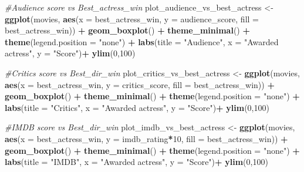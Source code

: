 \documentclass[]{article}
\newenvironment{Shaded}{\begin{snugshade}}{\end{snugshade}}
\newcommand{\KeywordTok}[1]{\textcolor[rgb]{0.13,0.29,0.53}{\textbf{#1}}}
\newcommand{\DataTypeTok}[1]{\textcolor[rgb]{0.13,0.29,0.53}{#1}}
\newcommand{\DecValTok}[1]{\textcolor[rgb]{0.00,0.00,0.81}{#1}}
\newcommand{\StringTok}[1]{\textcolor[rgb]{0.31,0.60,0.02}{#1}}
\newcommand{\CommentTok}[1]{\textcolor[rgb]{0.56,0.35,0.01}{\textit{#1}}}
\newcommand{\OperatorTok}[1]{\textcolor[rgb]{0.81,0.36,0.00}{\textbf{#1}}}
\newcommand{\NormalTok}[1]{#1}
\begin{document}
\begin{Shaded}
\begin{Highlighting}[]
\CommentTok{#Audience score vs Best_actress_win}
\NormalTok{plot_audience_vs_best_actress <-}
\StringTok{  }\KeywordTok{ggplot}\NormalTok{(movies,}
         \KeywordTok{aes}\NormalTok{(}\DataTypeTok{x =}\NormalTok{ best_actress_win, }\DataTypeTok{y =}\NormalTok{ audience_score, }\DataTypeTok{fill =}\NormalTok{ best_actress_win)) }\OperatorTok{+}
\StringTok{  }\KeywordTok{geom_boxplot}\NormalTok{() }\OperatorTok{+}
\StringTok{  }\KeywordTok{theme_minimal}\NormalTok{() }\OperatorTok{+}
\StringTok{  }\KeywordTok{theme}\NormalTok{(}\DataTypeTok{legend.position =} \StringTok{"none"}\NormalTok{) }\OperatorTok{+}
\StringTok{  }\KeywordTok{labs}\NormalTok{(}\DataTypeTok{title =} \StringTok{"Audience"}\NormalTok{, }\DataTypeTok{x =} \StringTok{"Awarded actress"}\NormalTok{, }\DataTypeTok{y =} \StringTok{"Score"}\NormalTok{)}\OperatorTok{+}
\StringTok{  }\KeywordTok{ylim}\NormalTok{(}\DecValTok{0}\NormalTok{,}\DecValTok{100}\NormalTok{)}

\CommentTok{#Critics score vs Best_dir_win}
\NormalTok{plot_critics_vs_best_actress <-}
\StringTok{  }\KeywordTok{ggplot}\NormalTok{(movies,}
         \KeywordTok{aes}\NormalTok{(}\DataTypeTok{x =}\NormalTok{ best_actress_win, }\DataTypeTok{y =}\NormalTok{ critics_score, }\DataTypeTok{fill =}\NormalTok{ best_actress_win)) }\OperatorTok{+}
\StringTok{  }\KeywordTok{geom_boxplot}\NormalTok{() }\OperatorTok{+}
\StringTok{  }\KeywordTok{theme_minimal}\NormalTok{() }\OperatorTok{+}
\StringTok{  }\KeywordTok{theme}\NormalTok{(}\DataTypeTok{legend.position =} \StringTok{"none"}\NormalTok{) }\OperatorTok{+}
\StringTok{  }\KeywordTok{labs}\NormalTok{(}\DataTypeTok{title =} \StringTok{"Critics"}\NormalTok{, }\DataTypeTok{x =} \StringTok{"Awarded actress"}\NormalTok{, }\DataTypeTok{y =} \StringTok{"Score"}\NormalTok{)}\OperatorTok{+}
\StringTok{  }\KeywordTok{ylim}\NormalTok{(}\DecValTok{0}\NormalTok{,}\DecValTok{100}\NormalTok{)}

\CommentTok{#IMDB score vs Best_dir_win}
\NormalTok{plot_imdb_vs_best_actress <-}
\StringTok{  }\KeywordTok{ggplot}\NormalTok{(movies,}
         \KeywordTok{aes}\NormalTok{(}\DataTypeTok{x =}\NormalTok{ best_actress_win, }\DataTypeTok{y =}\NormalTok{ imdb_rating}\OperatorTok{*}\DecValTok{10}\NormalTok{, }\DataTypeTok{fill =}\NormalTok{ best_actress_win)) }\OperatorTok{+}
\StringTok{  }\KeywordTok{geom_boxplot}\NormalTok{() }\OperatorTok{+}
\StringTok{  }\KeywordTok{theme_minimal}\NormalTok{() }\OperatorTok{+}
\StringTok{  }\KeywordTok{theme}\NormalTok{(}\DataTypeTok{legend.position =} \StringTok{"none"}\NormalTok{) }\OperatorTok{+}
\StringTok{  }\KeywordTok{labs}\NormalTok{(}\DataTypeTok{title =} \StringTok{"IMDB"}\NormalTok{, }\DataTypeTok{x =} \StringTok{"Awarded actress"}\NormalTok{, }\DataTypeTok{y =} \StringTok{"Score"}\NormalTok{)}\OperatorTok{+}
\StringTok{  }\KeywordTok{ylim}\NormalTok{(}\DecValTok{0}\NormalTok{,}\DecValTok{100}\NormalTok{)}


\end{Highlighting}
\end{Shaded}
\end{document}
